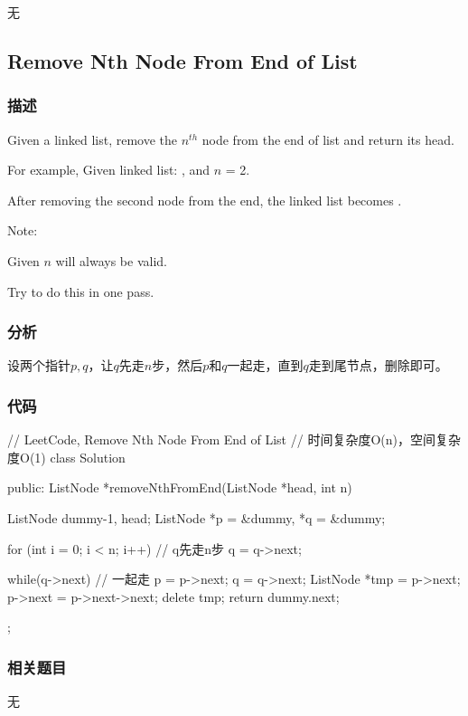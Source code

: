 \begindot
\item 无
\myenddot


\subsection{Remove Nth Node From End of List}
\label{sec:remove-nth-node-from-end-of-list}


\subsubsection{描述}
Given a linked list, remove the $n^{th}$ node from the end of list and return 
its head.

For example, Given linked list: , and $n$ = 2.

After removing the second node from the end, the linked list becomes 
.

Note:
\begindot
\item Given $n$ will always be valid.
\item Try to do this in one pass.
\myenddot


\subsubsection{分析}
设两个指针$p,q$，让$q$先走$n$步，然后$p$和$q$一起走，直到$q$走到尾节点，删除即可。


\subsubsection{代码}
\begin{Code}
	// LeetCode, Remove Nth Node From End of List
	// 时间复杂度O(n)，空间复杂度O(1)
	class Solution {
		public:
		ListNode *removeNthFromEnd(ListNode *head, int n) {
			ListNode dummy{-1, head};
			ListNode *p = &dummy, *q = &dummy;
			
			for (int i = 0; i < n; i++)  // q先走n步
			q = q->next;
			
			while(q->next) { // 一起走
				p = p->next;
				q = q->next;
			}
			ListNode *tmp = p->next;
			p->next = p->next->next;
			delete tmp;
			return dummy.next;
		}
	};
\end{Code}


\subsubsection{相关题目}

\begindot
\item 无
\myenddot


